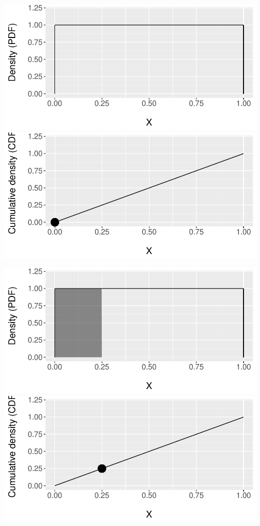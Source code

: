 \documentclass{beamer}
\begin{document}
\begin{frame}
\centering
\includegraphics[scale=.5]{figures/Unif1a.pdf} \\
\includegraphics[scale=.5]{figures/Unif1b.pdf}
\end{frame}

\begin{frame}
\centering
\includegraphics[scale=.5]{figures/Unif2a.pdf} \\
\includegraphics[scale=.5]{figures/Unif2b.pdf}
\end{frame}
\end{document}
